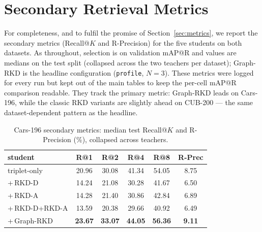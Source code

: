 \documentclass[11pt,letterpaper]{article}
\begin{document}



\appendix

\section{Secondary Retrieval Metrics}
\label{sec:appendix-secondary}

For completeness, and to fulfil the promise of Section~\ref{sec:metrics}, we report the
secondary metrics (Recall@$K$ and R-Precision) for the five students on both datasets.
As throughout, selection is on validation mAP@R and values are medians on the test split
(collapsed across the two teachers per dataset); Graph-RKD is the headline configuration
(\texttt{profile}, $N{=}3$). These metrics were logged for every run but kept out of the
main tables to keep the per-cell mAP@R comparison readable. They track the primary
metric: Graph-RKD leads on Cars-196, while the classic RKD variants are slightly ahead on
CUB-200 --- the same dataset-dependent pattern as the headline.

\begin{table}[htbp]
    \centering\small
    \caption{Cars-196 secondary metrics: median test Recall@$K$ and R-Precision (\%),
             collapsed across teachers.}
    \label{tab:recall-cars}
    \begin{tabular}{lccccc}
        \toprule
        student & R@1 & R@2 & R@4 & R@8 & R-Prec \\
        \midrule
        triplet-only    & 20.96 & 30.08 & 41.34 & 54.05 & 8.75 \\
        +\,RKD-D        & 14.24 & 21.08 & 30.28 & 41.67 & 6.50 \\
        +\,RKD-A        & 14.28 & 21.40 & 30.86 & 42.84 & 6.89 \\
        +\,RKD-D+RKD-A  & 13.59 & 20.38 & 29.66 & 40.92 & 6.49 \\
        +\,Graph-RKD    & \textbf{23.67} & \textbf{33.07} & \textbf{44.05} & \textbf{56.36} & \textbf{9.11} \\
        \bottomrule
    \end{tabular}
\end{table}
\end{document}
